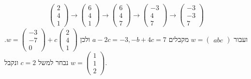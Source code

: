 \documentclass{article}
\begin{document}
\begin{align*}
    \begin{pmatrix}
        2 \\
        4 \\
        1
    \end{pmatrix}\rightarrow\begin{pmatrix}
                                6 \\
                                4 \\
                                1
                            \end{pmatrix}\rightarrow\begin{pmatrix}
                                                        6 \\
                                                        4 \\
                                                        7
                                                    \end{pmatrix}\rightarrow\begin{pmatrix}
                                                                                -3 \\
                                                                                4  \\
                                                                                7
                                                                            \end{pmatrix}\rightarrow\begin{pmatrix}
                                                                                                        -3 \\
                                                                                                        -3 \\
                                                                                                        7
                                                                                                    \end{pmatrix}
\end{align*}
ועבור $w=\begin{pmatrix}
        a
        b
        c
    \end{pmatrix}$ מקבלים $a-2c=-3, -b+4c=7$ ולכן $w=\begin{pmatrix}
        -3 \\
        -7 \\
        0
    \end{pmatrix}+c\begin{pmatrix}
        2 \\
        4 \\
        1
    \end{pmatrix}$. נבחר למשל $c=2$ ונקבל $w=\begin{pmatrix}
        1 \\
        1 \\
        2
    \end{pmatrix}$. \\
\end{document}
